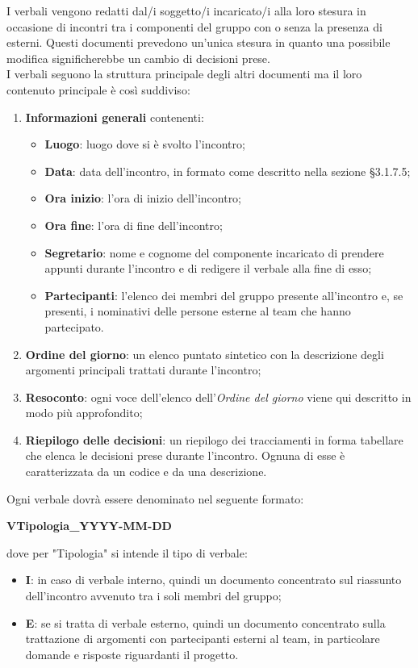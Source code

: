 	
	I verbali vengono redatti dal/i soggetto/i incaricato/i alla loro stesura in occasione di incontri tra i componenti del gruppo con o senza la presenza di esterni.  Questi documenti prevedono un'unica stesura in quanto una possibile modifica significherebbe un cambio di decisioni prese. \\
	I verbali seguono la struttura principale degli altri documenti ma il loro contenuto principale è così suddiviso:
	\begin{enumerate}
		\item \textbf{Informazioni generali} contenenti:
		\begin{itemize}
			\item \textbf{Luogo}: luogo dove si è svolto l'incontro;
			\item \textbf{Data}: data dell'incontro, in formato come descritto nella sezione §3.1.7.5;
			\item \textbf{Ora inizio}: l'ora di inizio dell'incontro;
			\item \textbf{Ora fine}: l'ora di fine dell'incontro;
			\item \textbf{Segretario}: nome e cognome del componente incaricato di prendere appunti durante l'incontro e di redigere il verbale alla fine di esso;
			\item \textbf{Partecipanti}: l'elenco dei membri del gruppo presente all'incontro e, se presenti, i nominativi delle persone esterne al team che hanno partecipato.
		\end{itemize}
		\item \textbf{Ordine del giorno}: un elenco puntato sintetico con la descrizione degli argomenti principali trattati durante l'incontro;
		\item \textbf{Resoconto}: ogni voce dell'elenco dell'\textit{Ordine del giorno} viene qui descritto in modo più approfondito;
		\item \textbf{Riepilogo delle decisioni}: un riepilogo dei tracciamenti in forma tabellare che elenca le decisioni prese durante l'incontro. Ognuna di esse è caratterizzata da un codice e da una descrizione.
	\end{enumerate}
	Ogni verbale dovrà essere denominato nel seguente formato:
	\begin{center}
	\textbf{VTipologia\_YYYY-MM-DD}
	\end{center}
	dove per "Tipologia" si intende il tipo di verbale:
	\begin{itemize}
		\item \textbf{I}: in caso di verbale interno, quindi un documento concentrato sul riassunto dell'incontro avvenuto tra i soli membri del gruppo;
		\item \textbf{E}: se si tratta di verbale esterno, quindi un documento concentrato sulla trattazione di argomenti con partecipanti esterni al team, in particolare domande e risposte riguardanti il progetto.
	\end{itemize}		
